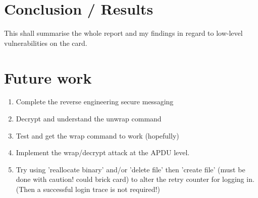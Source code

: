 \documentclass[bsc,frontabs,twoside,singlespacing,parskip,deptreport]{infthesis}     %
\begin{document}
\chapter{Conclusion / Results}

This shall summarise the whole report and my findings in regard to low-level vulnerabilities on the card. 

\chapter{Future work}

\begin{enumerate}
\item Complete the reverse engineering secure messaging
\item Decrypt and understand the unwrap command
\item Test and get the wrap command to work (hopefully)
\item Implement the wrap/decrypt attack at the APDU level.

\item Try using 'reallocate binary' and/or 'delete file' then 'create file' (must be done with caution! could brick card) to alter the retry counter for logging in. (Then a successful login trace is not required!)
\end{enumerate}
\end{document}
